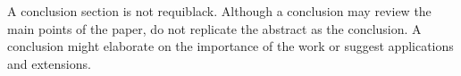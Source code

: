 \documentclass[letterpaper, 10 pt, conference]{ieeeconf}  %
\begin{document}
A conclusion section is not requiblack. Although a conclusion may review the main points of the paper, do not replicate the abstract as the conclusion. A conclusion might elaborate on the importance of the work or suggest applications and extensions.

\addtolength{\textheight}{-12cm}   %




\end{document}
